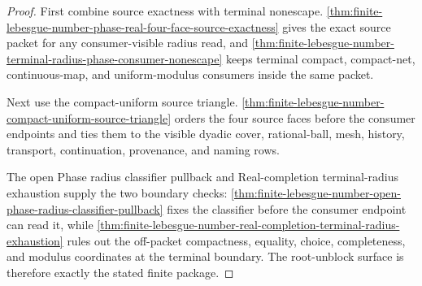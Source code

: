 \begin{proof}
First combine source exactness with terminal nonescape. \autoref{thm:finite-lebesgue-number-phase-real-four-face-source-exactness} gives the exact source packet for any consumer-visible radius read, and \autoref{thm:finite-lebesgue-number-terminal-radius-phase-consumer-nonescape} keeps terminal compact, compact-net, continuous-map, and uniform-modulus consumers inside the same packet.

Next use the compact-uniform source triangle. \autoref{thm:finite-lebesgue-number-compact-uniform-source-triangle} orders the four source faces before the consumer endpoints and ties them to the visible dyadic cover, rational-ball, mesh, history, transport, continuation, provenance, and naming rows.

The open Phase radius classifier pullback and Real-completion terminal-radius exhaustion supply the two boundary checks: \autoref{thm:finite-lebesgue-number-open-phase-radius-classifier-pullback} fixes the classifier before the consumer endpoint can read it, while \autoref{thm:finite-lebesgue-number-real-completion-terminal-radius-exhaustion} rules out the off-packet compactness, equality, choice, completeness, and modulus coordinates at the terminal boundary. The root-unblock surface is therefore exactly the stated finite package.
\end{proof}
